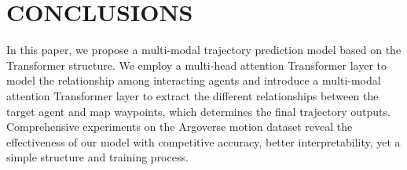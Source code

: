 \documentclass[letterpaper, 10 pt, conference]{ieeeconf}
\begin{document}
\begin{table}[htp]
\centering
\caption{Ablation study of the map structure and multi-modal prediction method on the Argoverse test set}
\label{tab2}
\end{table}

\section{CONCLUSIONS}

In this paper, we propose a multi-modal trajectory prediction model based on the Transformer structure. We employ a multi-head attention Transformer layer to model the relationship among interacting agents and introduce a multi-modal attention Transformer layer to extract the different relationships between the target agent and map waypoints, which determines the final trajectory outputs. Comprehensive experiments on the Argoverse motion dataset reveal the effectiveness of our model with competitive accuracy, better interpretability, yet a simple structure and training process.



\end{document}
